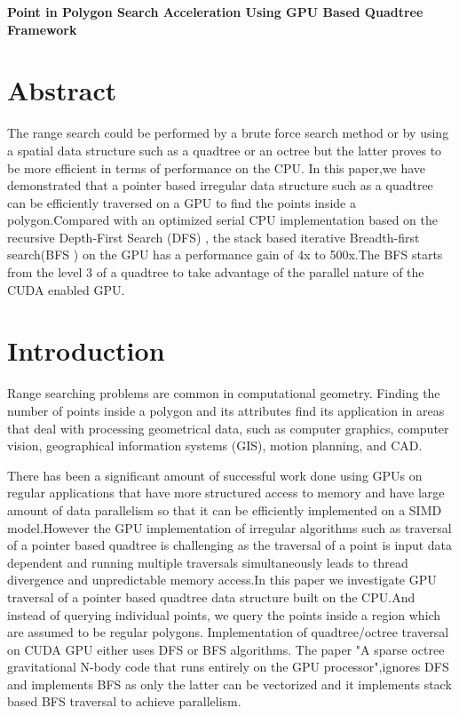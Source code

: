 \documentclass{article}
\begin{document}
\begin{titlepage}
   \begin{center}
      \Large\textbf{Point in Polygon Search Acceleration Using GPU Based Quadtree Framework}
   \end{center}
\end{titlepage}


\section{Abstract}

The range search could be performed by a brute force search method or by using a spatial data structure such as a quadtree or an octree but the latter proves to be more efficient in terms of performance on the CPU. 
In this paper,we have demonstrated that a pointer based irregular data structure such as a quadtree can be efficiently traversed on a GPU to find the points inside a polygon.Compared with an optimized serial CPU implementation based on the  recursive Depth-First Search (DFS) , the stack based iterative Breadth-first search(BFS ) on the GPU  has a performance gain of 4x to 500x.The BFS starts from the level 3 of a quadtree to take advantage of the parallel nature of the CUDA enabled GPU.

\section{Introduction}
Range searching problems are common in computational geometry. Finding the number of points inside a polygon and its attributes find its application in areas that deal with processing geometrical data, such as computer graphics, computer vision, geographical information systems (GIS), motion planning, and CAD. 

There has been a significant amount of successful work done using GPUs on regular applications that have more structured access to memory and have  large amount of data parallelism so that it can be efficiently implemented on a SIMD model.However the GPU implementation of irregular algorithms such as traversal of a pointer based quadtree is challenging as the traversal of a point is input data dependent and running multiple traversals simultaneously leads to thread divergence and unpredictable memory access.In this paper we investigate GPU traversal of a pointer based quadtree data structure built on the CPU.And instead of querying individual points, we query the points inside a region which are assumed to be regular polygons.
Implementation of quadtree/octree traversal on CUDA GPU either uses DFS or BFS algorithms. 
The paper "A sparse octree gravitational N-body code that runs entirely on the GPU processor",ignores DFS and implements  BFS as only the latter can be vectorized and it implements stack based BFS traversal to achieve parallelism.
\end{document}
